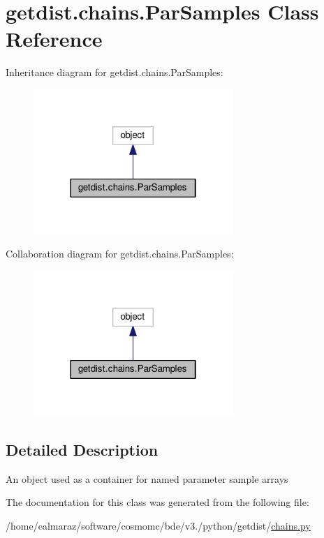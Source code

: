 \hypertarget{classgetdist_1_1chains_1_1ParSamples}{}\section{getdist.\+chains.\+Par\+Samples Class Reference}
\label{classgetdist_1_1chains_1_1ParSamples}


Inheritance diagram for getdist.\+chains.\+Par\+Samples\+:
\nopagebreak
\begin{figure}[H]
\begin{center}
\leavevmode
\includegraphics[width=214pt]{classgetdist_1_1chains_1_1ParSamples__inherit__graph}
\end{center}
\end{figure}


Collaboration diagram for getdist.\+chains.\+Par\+Samples\+:
\nopagebreak
\begin{figure}[H]
\begin{center}
\leavevmode
\includegraphics[width=214pt]{classgetdist_1_1chains_1_1ParSamples__coll__graph}
\end{center}
\end{figure}


\subsection{Detailed Description}
\begin{DoxyVerb}An object used as a container for named parameter sample arrays
\end{DoxyVerb}
 

The documentation for this class was generated from the following file\+:\begin{DoxyCompactItemize}
\item 
/home/ealmaraz/software/cosmomc/bde/v3./python/getdist/\mbox{\hyperlink{chains_8py}{chains.\+py}}\end{DoxyCompactItemize}
